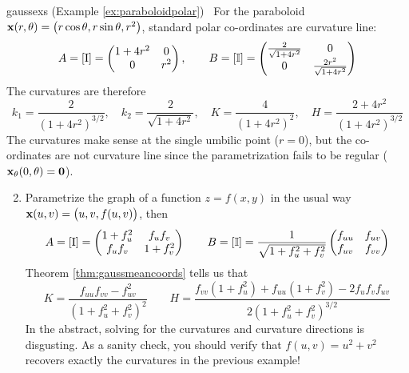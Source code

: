 \begin{examples}{}{gaussexs}
\exstart (Example \ref{ex:paraboloidpolar}) \ For the paraboloid ${\mathbf{x}}(r,\theta)=\bigl(r\cos\theta,r\sin\theta,r^2\bigr)$, standard polar co-ordinates are curvature line:
  \[A=[\mathrm{I}]=\begin{pmatrix}
  1+4r^2&0\\0&r^2
  \end{pmatrix},\qquad B=[\mathbb{I}]=\begin{pmatrix}
  \frac 2{\sqrt{1+4r^2}}&0\\
  0&\frac{2r^2}{\sqrt{1+4r^2}}
  \end{pmatrix}\]
  The curvatures are therefore
  \[
  k_1=\frac 2{(1+4r^2)^{3/2}},\quad k_2=\frac 2{\sqrt{1+4r^2}},\quad K=\frac 4{(1+4r^2)^2},\quad H=\frac{2+4r^2}{(1+4r^2)^{3/2}}
  \]
  The curvatures make sense at the single umbilic point ($r=0$), but the co-ordinates are not curvature line since the parametrization fails to be regular (${\mathbf{x}}_\theta(0,\theta)=\mathbf{0}$).
  
\goodbreak

\begin{enumerate}\setcounter{enumi}{1}
  \item\label{ex:gaussgraph} Parametrize the graph of a function $z=f(x,y)$ in the usual way ${\mathbf{x}}(u,v)=\bigl(u,v,f(u,v)\bigr)$, then
  \[A=[\mathrm{I}]=\begin{pmatrix}
  1+f_u^2&f_uf_v\\
  f_uf_v&1+f_v^2
  \end{pmatrix}\qquad B=[\mathbb{I}]=\frac 1{\sqrt{1+f_u^2+f_v^2}}
  \begin{pmatrix}
  f_{uu}&f_{uv}\\
  f_{uv}&f_{vv}
  \end{pmatrix}\]
  Theorem \ref{thm:gaussmeancoords} tells us that
	\[K=\frac{f_{uu}f_{vv}-f_{uv}^2}{(1+f_u^2+f_v^2)^2}\qquad H=\frac{f_{vv}(1+f_u^2)+f_{uu}(1+f_v^2)-2f_uf_vf_{uv}}{2(1+f_u^2+f_v^2)^{3/2}}\]
	In the abstract, solving for the curvatures and curvature directions is disgusting. As a sanity check, you should verify that $f(u,v)=u^2+v^2$ recovers exactly the curvatures in the previous example!
  

\end{enumerate}
\end{examples}
